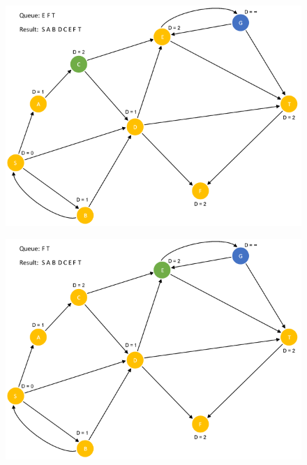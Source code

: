 \documentclass{article}
\begin{document}
\begin{figure}[H]
\centering
\includegraphics[scale=0.6]{images/Q4/12.png}
\end{figure}

\begin{figure}[H]
\centering
\includegraphics[scale=0.6]{images/Q4/13.png}
\end{figure}
\end{document}
